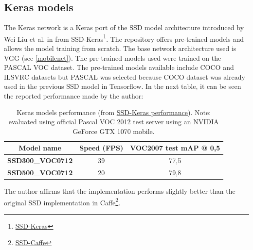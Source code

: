 \subsection{Keras models}
The Keras network is a Keras port of the SSD model architecture introduced by Wei Liu et al. in \cite{liu2016ssd} from SSD-Keras\footnote{\href{https://github.com/pierluigiferrari/ssd_keras}{SSD-Keras}}. The repository offers pre-trained models and allows the model training from scratch. The base network architecture used is VGG (see \ref{mobilenet}). The pre-trained models used were trained on the PASCAL VOC dataset. The pre-trained models available include COCO and ILSVRC datasets but PASCAL was selected because COCO dataset was already used in the previous SSD model in Tensorflow. In the next table, it can be seen the reported performance made by the author:
\begin{table}[H]
\begin{center}
\begin{tabular}{|c|c|c|}
\hline
Model name               & Speed (FPS) & VOC2007 test mAP @ 0,5 \\ \hline
\textbf{SSD300\_VOC0712} & 39          & 77,5                   \\ \hline
\textbf{SSD500\_VOC0712} & 20          & 79,8                   \\ \hline
\end{tabular}
\end{center}
\caption{Keras models performance (from \href{https://github.com/pierluigiferrari/ssd_keras#performance}{SSD-Keras performance}). Note: evaluated using official Pascal VOC 2012 test server using an NVIDIA GeForce GTX 1070 mobile.}
\end{table}
The author affirms that the implementation performs slightly better than the original SSD implementation in Caffe\footnote{\href{https://github.com/weiliu89/caffe/tree/ssd}{SSD-Caffe}}.

